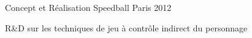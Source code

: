 \begin{cventries}
  \cventry
    {Concept et Réalisation} %
    {Speedball} %
    {Paris} %
    {2012} %
    {
      \begin{cvitems} %
        \item {R\&D sur les techniques de jeu à contrôle indirect du personnage}
      \end{cvitems}
    }

\end{cventries}
